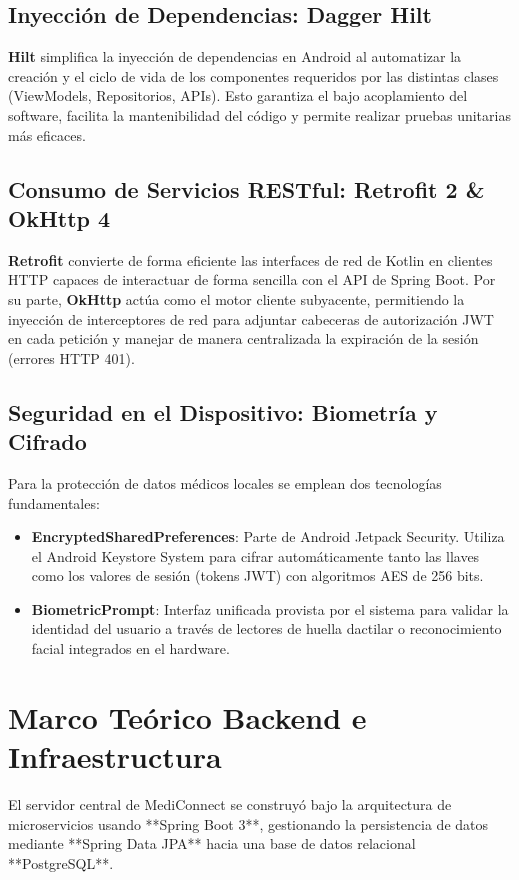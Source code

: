 \documentclass[12pt,a4paper]{report}
\begin{document}
\subsection{Inyección de Dependencias: Dagger Hilt}
\textbf{Hilt} simplifica la inyección de dependencias en Android al automatizar la creación y el ciclo de vida de los componentes requeridos por las distintas clases (ViewModels, Repositorios, APIs). Esto garantiza el bajo acoplamiento del software, facilita la mantenibilidad del código y permite realizar pruebas unitarias más eficaces.

\subsection{Consumo de Servicios RESTful: Retrofit 2 \& OkHttp 4}
\textbf{Retrofit} convierte de forma eficiente las interfaces de red de Kotlin en clientes HTTP capaces de interactuar de forma sencilla con el API de Spring Boot. Por su parte, \textbf{OkHttp} actúa como el motor cliente subyacente, permitiendo la inyección de interceptores de red para adjuntar cabeceras de autorización JWT en cada petición y manejar de manera centralizada la expiración de la sesión (errores HTTP 401).

\subsection{Seguridad en el Dispositivo: Biometría y Cifrado}
Para la protección de datos médicos locales se emplean dos tecnologías fundamentales:
\begin{itemize}
    \item \textbf{EncryptedSharedPreferences}: Parte de Android Jetpack Security. Utiliza el Android Keystore System para cifrar automáticamente tanto las llaves como los valores de sesión (tokens JWT) con algoritmos AES de 256 bits.
    \item \textbf{BiometricPrompt}: Interfaz unificada provista por el sistema para validar la identidad del usuario a través de lectores de huella dactilar o reconocimiento facial integrados en el hardware.
\end{itemize}

\section{Marco Teórico Backend e Infraestructura}
El servidor central de MediConnect se construyó bajo la arquitectura de microservicios usando **Spring Boot 3**, gestionando la persistencia de datos mediante **Spring Data JPA** hacia una base de datos relacional **PostgreSQL**. 
\end{document}

